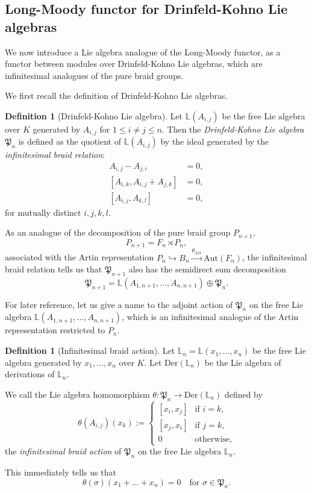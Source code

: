 \documentclass[a4paper,12pt]{article}
\theoremstyle{definition}
\newtheorem{df}[thm]{Definition}
\theoremstyle{remark}
\begin{document}
\subsection{Long-Moody functor for Drinfeld-Kohno Lie algebras}
We now introduce 
a Lie algebra analogue of the Long-Moody functor,
as a functor between modules over Drinfeld-Kohno Lie algebras,
which are infinitesimal analogues of the pure braid groups. 

We first recall the definition of Drinfeld-Kohno Lie algebras.
\begin{df}[Drinfeld-Kohno Lie algebra]
	Let $\mathbb{L}(A_{i,j})$ be the free Lie algebra over $K$ 
	generated by $A_{i,j}$ for $1\le i\neq j\le n$.
	Then the \emph{Drinfeld-Kohno Lie algebra $\mathfrak{P}_{n}$}  
	is defined as the quotient 
	of $\mathbb{L}(A_{i,j})$ by the ideal generated by the \emph{infinitesimal braid relation}:
	\begin{align*}
	A_{i,j}-A_{j,i}&=0, \\
	[A_{i,k},A_{i,j}+A_{j,k}]&=0,\\
	[A_{i,j},A_{k,l}]&=0, 
\end{align*}
for mutually distinct $i,j,k,l$.
\end{df}
As an analogue of the decomposition of the pure braid group $P_{n+1}$,
\[
	P_{n+1}=F_{n}\rtimes P_{n},
\]
associated with the Artin representation $P_{n}\hookrightarrow B_{n}\xrightarrow{\theta_{\mathrm{Art}}}
\mathrm{Aut}(F_{n})$,
the infinitesimal braid relation tells us that 
$\mathfrak{P}_{n+1}$ also has the semidirect sum decomposition
\[
	\mathfrak{P}_{n+1}=\mathbb{L}(A_{1,n+1},\ldots,A_{n,n+1})\oplus \mathfrak{P}_{n}.
\]

For later reference, let us give a name to
the adjoint action of $\mathfrak{P}_{n}$ on the free Lie algebra $\mathbb{L}(A_{1,n+1},\ldots,A_{n,n+1})$,
which is an infinitesimal analogue of the Artin representation restricted to $P_{n}$.
\begin{df}[Infinitesimal braid action]\label{Infbraidaction}
	Let $\mathbb{L}_{n}=\mathbb{L}(x_{1},\ldots,x_{n})$ be the free Lie algebra generated by $x_{1},\ldots,x_{n}$
	over $K$. Let $\mathrm{Der}(\mathbb{L}_{n})$ be the Lie algebra of derivations of $\mathbb{L}_{n}$.
	
	We call the Lie algebra homomorphism $\theta\colon \mathfrak{P}_{n}\to \mathrm{Der}(\mathbb{L}_{n})$
	defined by 
	\[
	\theta(A_{i,j})(x_{k}):=
	\begin{cases}
		[x_{i},x_{j}] & \text{if $i=k$},\\
		[x_{j},x_{i}] & \text{if $j=k$},\\
		0 & \text{otherwise},
	\end{cases}
\]
	the \emph{infinitesimal braid action} of $\mathfrak{P}_{n}$ on the free Lie algebra $\mathbb{L}_{n}$.
\end{df}
This immediately tells us that 
\[
	\theta(\sigma)(x_{1}+\ldots+x_{n})=0\quad \text{for $\sigma\in \mathfrak{P}_{n}$}.
\] 
\end{document}
